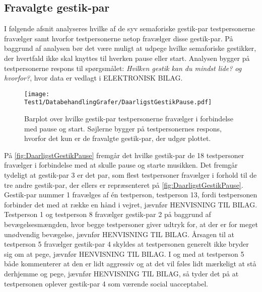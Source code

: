\subsection{Fravalgte gestik-par}
\label{TestresultaterPauseStartDaarlig}
%
I følgende afsnit analyseres hvilke af de syv semaforiske gestik-par testpersonerne fravælger samt hvorfor testpersonerne netop fravælger disse gestik-par. På baggrund af analysen bør det være muligt at udpege hvilke semaforiske gestikker, der hvertfald ikke skal knyttes til hverken pause eller start. Analysen bygger på testpersonerne respons til spørgsmålet: \textit{Hvilken gestik kan du mindst lide? og hvorfor?}, hvor data er vedlagt i ELEKTRONISK BILAG.
%
\begin{figure}[H]
	\centering
	\texttt{[image: Test1/DatabehandlingGrafer/DaarligstGestikPause.pdf]}
	\caption{Barplot over hvilke gestik-par testpersonerne fravælger i forbindelse med pause og start. Søjlerne bygger på testpersonernes respons, hvorfor det kun er de fravalgte gestik-par, der udgør plottet.}
	\label{fig:DaarligstGestikPause}
\end{figure}
\noindent
% 
På \autoref{fig:DaarligstGestikPause} fremgår det hvilke gestik-par de 18 testpersoner fravælger i forbindelse med at skulle pause og starte musikken. Det fremgår tydeligt at gestik-par 3 er det par, som flest testpersoner fravælger i forhold til de tre andre gestik-par, der ellers er repræsenteret på \autoref{fig:DaarligstGestikPause}. Gestik-par nummer 1 fravælges af én testperson, testperson 13, fordi testpersonen forbinder det med at række en hånd i vejret, jævnfør HENVISNING TIL BILAG. Testperson 1 og testperson 8 fravælger gestik-par 2 på baggrund af bevægelsesmængden, hvor begge testpersoner giver udtryk for, at der er for meget unødvendig bevægelse, jævnfør HENVISNING TIL BILAG. Årsagen til at testperson 5 fravælger gestik-par 4 skyldes at testpersonen generelt ikke bryder sig om at pege, jævnfør HENVISNING TIL BILAG. I og med at testperson 5 både kommenterer at den er lidt aggressiv og at det vil føles lidt mærkeligt at stå derhjemme og pege, jævnfør HENVISNING TIL BILAG, så tyder det på at testpersonen oplever gestik-par 4 som værende social uacceptabel. 

